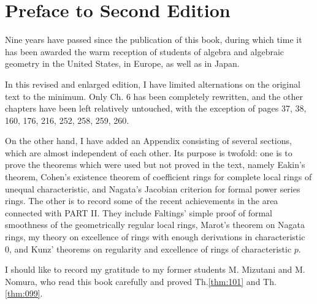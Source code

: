 \documentclass[../main]{subfiles}
\begin{document}
\chapter*{Preface to Second Edition}

Nine years have passed since the publication of this book, during which time it has been awarded the warm reception of students of algebra and algebraic geometry in the United States, in Europe, as well as in Japan.

In this revised and enlarged edition, I have limited alternations on the original text to the minimum. Only Ch. 6 has been completely rewritten, and the other chapters have been left relatively untouched, with the exception of pages
37, 38, 160, 176, 216, 252, 258, 259, 260.

On the other hand, I have added an Appendix consisting of several sections, which are almost independent of each other. Its purpose is twofold: one is to prove the theorems which were used but not proved in the text, namely Eakin’s theorem, Cohen’s existence theorem of coefficient rings for complete local rings of unequal characteristic, and Nagata’s Jacobian criterion for formal power series rings. The other is to record some of the recent achievements in the area connected with PART II. They include Faltings’ simple proof of formal smoothness of the geometrically regular local rings, Marot’s theorem on Nagata rings, my theory on excellence of rings with enough derivations in characteristic 0, and Kunz’ theorems on regularity and excellence of rings of characteristic $p$.

I should like to record my gratitude to my former students M. Mizutani and M. Nomura, who read this book carefully and proved Th.\ref{thm:101} and Th.\ref{thm:099}.
\end{document}

